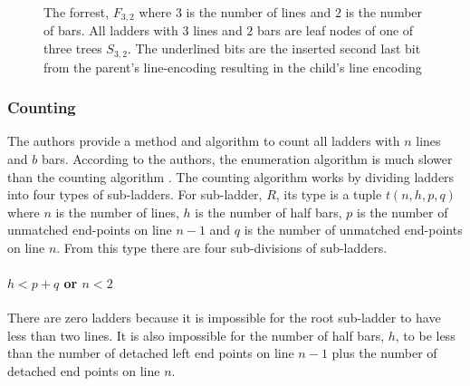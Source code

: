 \begin{figure}[!htp]
\begin{flushleft}
\begin{minipage}{0.8\textwidth}
        \end{minipage}
    \end{flushleft}
    \caption{The forrest, $F_{3,2}$ where $3$ is the number of lines and $2$ is the number of bars. All ladders with $3$ lines and $2$ bars are leaf nodes of one of three trees $S_{3,2}$.
    The underlined bits are the inserted second last bit from the parent's line-encoding resulting in the child's line encoding}
\end{figure}


\subsubsection{Counting}
The authors provide a method and algorithm to count all ladders 
with $n$ lines and $b$ bars. According to the authors, the enumeration algorithm is 
much slower than the counting algorithm \cite{A6}. The counting algorithm 
works by dividing ladders into four types of sub-ladders.
For sub-ladder, $R$, its type is a tuple $t(n,h,p,q)$ where 
$n$ is the number of lines, $h$ is the number of half bars, 
$p$ is the number of unmatched end-points on line $n-1$ and 
$q$ is the number of unmatched end-points on line $n$. From this 
type there are four sub-divisions of sub-ladders.
\paragraph{ $h < p+q$ or $n<2$}
There are zero ladders because it is impossible for the 
root sub-ladder to have less than two lines. It is also 
impossible for the number of half bars, $h$, to 
be less than the number of detached left end points 
on line $n-1$ plus the number of detached end points on 
line $n$.

